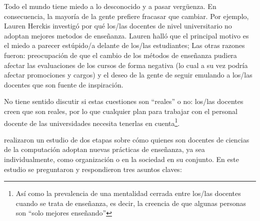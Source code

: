 
Todo el mundo tiene miedo a lo desconocido y a pasar vergüenza. En consecuencia,
la mayoría de la gente prefiere fracasar que cambiar.
Por ejemplo,
Lauren Herckis investigó 
{por qué los/las docentes de nivel universitario no adoptan mejores metodos de enseñanza}.
Lauren halló que el principal motivo es el miedo a parecer estúpido/a delante de los/las estudiantes; 
Las otras razones fueron:
preocupación de que el cambio de los métodos de enseñanza pudiera afectar las evaluaciones de los cursos de forma negativa
(lo cual a su vez podría afectar promociones y cargos) 
y el deseo de la gente de seguir emulando a los/las docentes que son fuente de inspiración. 

No tiene sentido discutir si estas cuestiones son ``reales'' o no:
los/las docentes creen que son reales,
por lo que cualquier plan para trabajar con el personal docente de las universidades necesita tenerlas en cuenta\footnote{
Así como la prevalencia de una mentalidad cerrada entre los/las docentes cuando se trata de enseñanza, es decir,
la creencia de que algunas personas son ``solo mejores enseñando'' }.

\cite{Bark2015} realizaron un estudio de dos etapas sobre cómo quienes 
son docentes de ciencias de la computación adoptan nuevas prácticas de enseñanza, 
ya sea individualmente, como organización o en la sociedad en su conjunto. En este estudio se preguntaron 
y respondieron tres asuntos claves:

